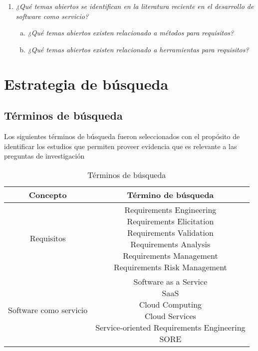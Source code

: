 \documentclass{article}
\begin{document}
\begin{enumerate}[P 1.-]
  \item\emph{¿Qué temas abiertos se identifican en la literatura reciente en el desarrollo de software como servicio?}
  \begin{enumerate}[(a)]
  \item \emph{¿Qué temas abiertos existen relacionado a métodos para requisitos?}
  \item \emph{¿Qué temas abiertos existen relacionado a herramientas para requisitos?}
  \end{enumerate}

\end{enumerate}

\newpage


\section{Estrategia de búsqueda}


\subsection{Términos de búsqueda}
Los siguientes términos de búsqueda fueron seleccionados con el propósito de identificar los estudios que 
permiten proveer evidencia que es relevante a las preguntas de investigación

\begin{table}[ht]
        \caption{Términos de búsqueda} 
        \centering %
        \begin{tabular}{c c}
                \hline
                Concepto & Término de búsqueda\\ [0.5ex] %
                \hline %
                Requisitos             & \makecell{Requirements Engineering \\
                Requirements Elicitation \\
                Requirements Validation \\
                Requirements Analysis \\
                Requirements Management \\
                Requirements Risk Management} \\ 
                \hline %
                Software como servicio & \makecell{Software as a Service \\
                SaaS \\
                Cloud Computing \\
                Cloud Services\\
                Service-oriented Requirements Engineering \\
                SORE } \\[1ex] 
                \hline 
        \end{tabular}
        \label{table:tablaterminos} %
\end{table}
\end{document}
